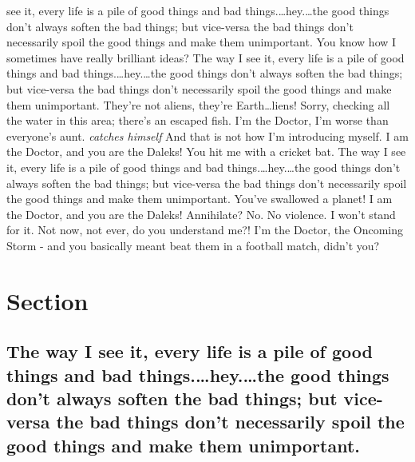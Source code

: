 see it, every life is a pile of good things and bad
things.\ldots{}hey.\ldots{}the good things don't always soften the bad
things; but vice-versa the bad things don't necessarily spoil the good
things and make them unimportant. You know how I sometimes have really
brilliant ideas? The way I see it, every life is a pile of good things
and bad things.\ldots{}hey.\ldots{}the good things don't always soften
the bad things; but vice-versa the bad things don't necessarily spoil
the good things and make them unimportant. They're not aliens, they're
Earth\ldots{}liens! Sorry, checking all the water in this area; there's
an escaped fish. I'm the Doctor, I'm worse than everyone's aunt.
\emph{catches himself} And that is not how I'm introducing myself. I am
the Doctor, and you are the Daleks! You hit me with a cricket bat. The
way I see it, every life is a pile of good things and bad
things.\ldots{}hey.\ldots{}the good things don't always soften the bad
things; but vice-versa the bad things don't necessarily spoil the good
things and make them unimportant. You've swallowed a planet! I am the
Doctor, and you are the Daleks! Annihilate? No. No violence. I won't
stand for it. Not now, not ever, do you understand me?! I'm the Doctor,
the Oncoming Storm - and you basically meant beat them in a football
match, didn't you?

\section{Section}\label{section-3.2}

\subsection{The way I see it, every life is a pile of good things and
bad things.\ldots{}hey.\ldots{}the good things don't always soften the
bad things; but vice-versa the bad things don't necessarily spoil the
good things and make them
unimportant.}\label{the-way-i-see-it-every-life-is-a-pile-of-good-things-and-bad-things.hey.the-good-things-dont-always-soften-the-bad-things-but-vice-versa-the-bad-things-dont-necessarily-spoil-the-good-things-and-make-them-unimportant.}

